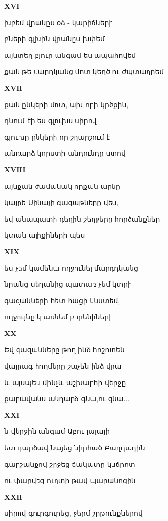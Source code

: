 \centerline{\bf XVI}

խբեմ վրանըս օձ - կարիճների



բների գլխին վրանըս խփեմ



այնտեղ բյուր անգամ ես ապահովեմ 


քան թե  մարդկանց մոտ կեղծ ու  ժպտադրեմ



\centerline    {\bf XVII} 

  քան ընկերի մոտ, ախ որի կրծքին,


դնում էի ես գլուխս սիրով


գլուխը ընկերի որ շղարշում է


անդարձ կորստի անդունդը ստով



\centerline{\bf XVIII}

 այնքան ժամանակ որքան արնը



 կայրե  Սինայի գագաթները վես,


եվ անապատի դեղին շեղջերը հորձանքներ 



կտան ալիքիների պես




\centerline {\bf    XIX}

     ես չեմ կամենա ողջունել մարդդկանց



  նրանց սեղանից պատառ չեմ կտրի 


  գազանների հետ հացի կնստեմ,

  
  ողջույնը կ առնեմ բորենիների


\centerline {\bf XX}

Եվ գազանները թող ինձ հոշոտեն


վայրագ հողմերը շաչեն ինձ վրա


 և այսպես մինչև աշխարհի վերջը



 քարավանս անդարձ գնա,ու գնա...



\centerline {\bf XXI}

ն վերջին անգամ Աբու լալայի


ետ դարձավ նայեց նիրհած Բաղդադին


գարշանքով շրջեց ճակատը կնճրոտ

ու փարվեց ուղտի թավ պարանոցին


\centerline {\bf XXII}
 

սիրով գուրգուրեց, ջերմ շրթունքներով



